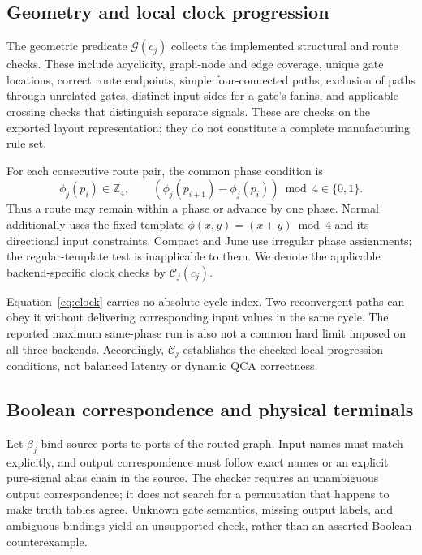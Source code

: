 \documentclass[ASNA,twocolumn]{USG}
\begin{document}
\subsection{Geometry and local clock progression}
The geometric predicate $\mathcal G(c_j)$ collects the implemented structural and route checks. These include acyclicity, graph-node and edge coverage, unique gate locations, correct route endpoints, simple four-connected paths, exclusion of paths through unrelated gates, distinct input sides for a gate's fanins, and applicable crossing checks that distinguish separate signals. These are checks on the exported layout representation; they do not constitute a complete manufacturing rule set.

For each consecutive route pair, the common phase condition is
\begin{equation}\label{eq:clock}
\phi_j(p_i)\in\mathbb Z_4,\qquad
(\phi_j(p_{i+1})-\phi_j(p_i))\bmod4\in\{0,1\}.
\end{equation}
Thus a route may remain within a phase or advance by one phase. Normal additionally uses the fixed template $\phi(x,y)=(x+y)\bmod4$ and its directional input constraints. Compact and June use irregular phase assignments; the regular-template test is inapplicable to them. We denote the applicable backend-specific clock checks by $\mathcal C_j(c_j)$.

Equation~\eqref{eq:clock} carries no absolute cycle index. Two reconvergent paths can obey it without delivering corresponding input values in the same cycle. The reported maximum same-phase run is also not a common hard limit imposed on all three backends. Accordingly, $\mathcal C_j$ establishes the checked local progression conditions, not balanced latency or dynamic QCA correctness.

\subsection{Boolean correspondence and physical terminals}
Let $\beta_j$ bind source ports to ports of the routed graph. Input names must match explicitly, and output correspondence must follow exact names or an explicit pure-signal alias chain in the source. The checker requires an unambiguous output correspondence; it does not search for a permutation that happens to make truth tables agree. Unknown gate semantics, missing output labels, and ambiguous bindings yield an unsupported check, rather than an asserted Boolean counterexample.
\end{document}
